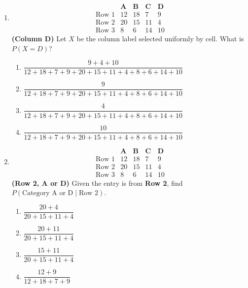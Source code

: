 \begin{enumerate}[label=\textbf{S\arabic*.}]
\item
\[
\begin{array}{l|cccc}
    & \mathbf{A} & \mathbf{B} & \mathbf{C} & \mathbf{D} \\\hline
\text{Row 1} & 12 & 18 & 7 & 9 \\
\text{Row 2} & 20 & 15 & 11 & 4 \\
\text{Row 3} & 8  & 6  & 14 & 10
\end{array}
\]
\textbf{(Column D)} Let $X$ be the column label selected uniformly by cell. What is $P(X=D)$?
\begin{enumerate}[label=(\Alph*)]
\item $\dfrac{9+4+10}{12+18+7+9+20+15+11+4+8+6+14+10}$
\item $\dfrac{9}{12+18+7+9+20+15+11+4+8+6+14+10}$
\item $\dfrac{4}{12+18+7+9+20+15+11+4+8+6+14+10}$
\item $\dfrac{10}{12+18+7+9+20+15+11+4+8+6+14+10}$
\end{enumerate}

\item
\[
\begin{array}{l|cccc}
    & \mathbf{A} & \mathbf{B} & \mathbf{C} & \mathbf{D} \\\hline
\text{Row 1} & 12 & 18 & 7 & 9 \\
\text{Row 2} & 20 & 15 & 11 & 4 \\
\text{Row 3} & 8  & 6  & 14 & 10
\end{array}
\]
\textbf{(Row 2, A or D)} Given the entry is from \textbf{Row 2}, find $P(\text{Category A or D}\mid \text{Row 2})$.
\begin{enumerate}[label=(\Alph*)]
\item $\dfrac{20+4}{20+15+11+4}$
\item $\dfrac{20+11}{20+15+11+4}$
\item $\dfrac{15+11}{20+15+11+4}$
\item $\dfrac{12+9}{12+18+7+9}$
\end{enumerate}

\end{enumerate}
    









